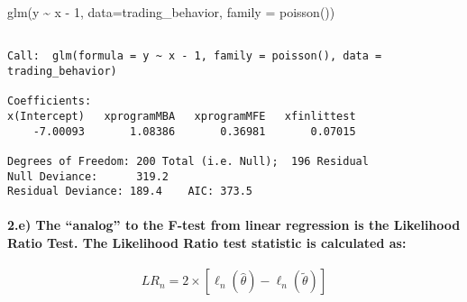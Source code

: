 \documentclass[
  letterpaper,
  DIV=11,
  numbers=noendperiod]{scrartcl}
\let\oldparagraph\paragraph
\renewcommand{\paragraph}[1]{\oldparagraph{#1}\mbox{}}
\newenvironment{Shaded}{\begin{snugshade}}{\end{snugshade}}
\newcommand{\AttributeTok}[1]{\textcolor[rgb]{0.40,0.45,0.13}{#1}}
\newcommand{\DecValTok}[1]{\textcolor[rgb]{0.68,0.00,0.00}{#1}}
\newcommand{\FunctionTok}[1]{\textcolor[rgb]{0.28,0.35,0.67}{#1}}
\newcommand{\NormalTok}[1]{\textcolor[rgb]{0.00,0.23,0.31}{#1}}
\newcommand{\SpecialCharTok}[1]{\textcolor[rgb]{0.37,0.37,0.37}{#1}}
\begin{document}
\begin{Shaded}
\begin{Highlighting}[]
\FunctionTok{glm}\NormalTok{(y }\SpecialCharTok{\textasciitilde{}}\NormalTok{ x }\SpecialCharTok{{-}} \DecValTok{1}\NormalTok{, }\AttributeTok{data=}\NormalTok{trading\_behavior, }\AttributeTok{family =} \FunctionTok{poisson}\NormalTok{())}
\end{Highlighting}
\end{Shaded}

\begin{verbatim}

Call:  glm(formula = y ~ x - 1, family = poisson(), data = trading_behavior)

Coefficients:
x(Intercept)   xprogramMBA   xprogramMFE   xfinlittest  
    -7.00093       1.08386       0.36981       0.07015  

Degrees of Freedom: 200 Total (i.e. Null);  196 Residual
Null Deviance:      319.2 
Residual Deviance: 189.4    AIC: 373.5
\end{verbatim}

\hypertarget{e-the-analog-to-the-f-test-from-linear-regression-is-the-likelihood-ratio-test.-the-likelihood-ratio-test-statistic-is-calculated-as}{%
\paragraph{2.e) The ``analog'' to the F-test from linear regression is
the Likelihood Ratio Test. The Likelihood Ratio test statistic is
calculated
as:}\label{e-the-analog-to-the-f-test-from-linear-regression-is-the-likelihood-ratio-test.-the-likelihood-ratio-test-statistic-is-calculated-as}}

\[ LR_n = 2 \times [ \ell_n(\hat{\theta}) - \ell_n(\tilde{\theta})] \]
\end{document}
